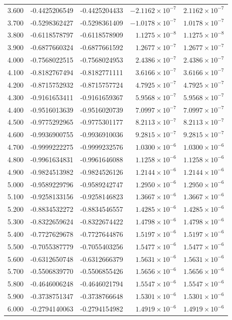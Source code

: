 \documentclass[11pt,a4paper]{article}
\begin{document}
\begin{longtable}{rrrrr}
3.600 & -0.4425206549 & -0.4425204433 & $-2.1162\times 10^{-7}$ & $2.1162\times 10^{-7}$ \\
3.700 & -0.5298362427 & -0.5298361409 & $-1.0178\times 10^{-7}$ & $1.0178\times 10^{-7}$ \\
3.800 & -0.6118578797 & -0.6118578909 & $1.1275\times 10^{-8}$ & $1.1275\times 10^{-8}$ \\
3.900 & -0.6877660324 & -0.6877661592 & $1.2677\times 10^{-7}$ & $1.2677\times 10^{-7}$ \\
4.000 & -0.7568022515 & -0.7568024953 & $2.4386\times 10^{-7}$ & $2.4386\times 10^{-7}$ \\
4.100 & -0.8182767494 & -0.8182771111 & $3.6166\times 10^{-7}$ & $3.6166\times 10^{-7}$ \\
4.200 & -0.8715752932 & -0.8715757724 & $4.7925\times 10^{-7}$ & $4.7925\times 10^{-7}$ \\
4.300 & -0.9161653411 & -0.9161659367 & $5.9568\times 10^{-7}$ & $5.9568\times 10^{-7}$ \\
4.400 & -0.9516013639 & -0.9516020739 & $7.0997\times 10^{-7}$ & $7.0997\times 10^{-7}$ \\
4.500 & -0.9775292965 & -0.9775301177 & $8.2113\times 10^{-7}$ & $8.2113\times 10^{-7}$ \\
4.600 & -0.9936900755 & -0.9936910036 & $9.2815\times 10^{-7}$ & $9.2815\times 10^{-7}$ \\
4.700 & -0.9999222275 & -0.9999232576 & $1.0300\times 10^{-6}$ & $1.0300\times 10^{-6}$ \\
4.800 & -0.9961634831 & -0.9961646088 & $1.1258\times 10^{-6}$ & $1.1258\times 10^{-6}$ \\
4.900 & -0.9824513982 & -0.9824526126 & $1.2144\times 10^{-6}$ & $1.2144\times 10^{-6}$ \\
5.000 & -0.9589229796 & -0.9589242747 & $1.2950\times 10^{-6}$ & $1.2950\times 10^{-6}$ \\
5.100 & -0.9258133156 & -0.9258146823 & $1.3667\times 10^{-6}$ & $1.3667\times 10^{-6}$ \\
5.200 & -0.8834532272 & -0.8834546557 & $1.4285\times 10^{-6}$ & $1.4285\times 10^{-6}$ \\
5.300 & -0.8322659624 & -0.8322674422 & $1.4798\times 10^{-6}$ & $1.4798\times 10^{-6}$ \\
5.400 & -0.7727629678 & -0.7727644876 & $1.5197\times 10^{-6}$ & $1.5197\times 10^{-6}$ \\
5.500 & -0.7055387779 & -0.7055403256 & $1.5477\times 10^{-6}$ & $1.5477\times 10^{-6}$ \\
5.600 & -0.6312650748 & -0.6312666379 & $1.5631\times 10^{-6}$ & $1.5631\times 10^{-6}$ \\
5.700 & -0.5506839770 & -0.5506855426 & $1.5656\times 10^{-6}$ & $1.5656\times 10^{-6}$ \\
5.800 & -0.4646006248 & -0.4646021794 & $1.5547\times 10^{-6}$ & $1.5547\times 10^{-6}$ \\
5.900 & -0.3738751347 & -0.3738766648 & $1.5301\times 10^{-6}$ & $1.5301\times 10^{-6}$ \\
6.000 & -0.2794140063 & -0.2794154982 & $1.4919\times 10^{-6}$ & $1.4919\times 10^{-6}$ \\
\end{longtable}
\endgroup
\clearpage
\end{document}
